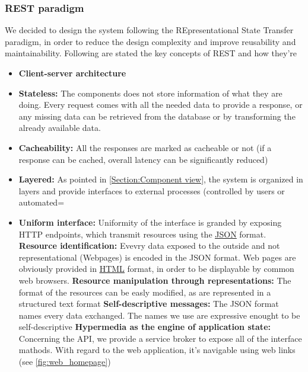 \documentclass{article}
\newcommand{\link}[2]{{\color{blue}\underline{\href{#1}{#2}}}}
\begin{document}
		\subsubsection{REST paradigm}
			We decided to design the system following the REpresentational State Transfer paradigm, 				in order to reduce the design complexity and improve reusability and maintainability.
			Following are stated the key concepts of REST and how they're 
			\begin{itemize}
				\item \textbf{Client-server architecture}
				\item \textbf{Stateless:} 
					The components does not store information of what they are doing. Every request comes with all the needed data to
					provide a response, or any missing data can be retrieved from the database or by transforming the already available
					data.
				\item \textbf{Cacheability:} 
					All the responses are marked as cacheable or not (if a response can be cached, overall 
					latency can be significantly reduced)
				\item \textbf{Layered:} 
					As pointed in \ref{Section:Component view}, the system is organized in layers and provide
					interfaces to external processes (controlled by users or automated=
				\item \textbf{Uniform interface:} 
					Uniformity of the interface is granded by exposing HTTP endpoints, which transmit resources using
					the \link{https://json.org/json-en.html}{JSON} format.
					\subitem \textbf{Resource identification:} 
						Evevry data exposed to the outside and not representational (Webpages) is 
						encoded in the JSON format. Web pages are obviously provided in 
						\link{https://en.wikipedia.org/wiki/HTML}{HTML} format, in order to be displayable by
						common web browsers.
					\subitem \textbf{Resource manipulation through representations:}
						The format of the resources can be easly modified, as are represented
						in a structured text format
					\subitem \textbf{Self-descriptive messages:}
						The JSON format names every data exchanged. The names we use are
						expressive enought to be self-descriptive
					\subitem \textbf{Hypermedia as the engine of application state:}
						Concerning the API, we provide a service broker to expose all of the
						interface mathods. With regard to the web application, it's navigable 
						using web links (see \cref{fig:web_homepage})
			\end{itemize}
\end{document}
